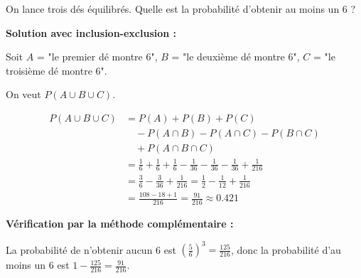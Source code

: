 \begin{examplebox}
On lance trois dés équilibrés. Quelle est la probabilité d'obtenir au moins un 6 ?

\textbf{Solution avec inclusion-exclusion :}

Soit $A$ = "le premier dé montre 6", $B$ = "le deuxième dé montre 6", $C$ = "le troisième dé montre 6".

On veut $P(A \cup B \cup C)$.

\begin{align*}
P(A \cup B \cup C) &= P(A) + P(B) + P(C) \\
&\quad - P(A \cap B) - P(A \cap C) - P(B \cap C) \\
&\quad + P(A \cap B \cap C) \\
&= \frac{1}{6} + \frac{1}{6} + \frac{1}{6} - \frac{1}{36} - \frac{1}{36} - \frac{1}{36} + \frac{1}{216} \\
&= \frac{3}{6} - \frac{3}{36} + \frac{1}{216} = \frac{1}{2} - \frac{1}{12} + \frac{1}{216} \\
&= \frac{108 - 18 + 1}{216} = \frac{91}{216} \approx 0.421
\end{align*}

\textbf{Vérification par la méthode complémentaire :}

La probabilité de n'obtenir aucun 6 est $\left(\frac{5}{6}\right)^3 = \frac{125}{216}$, donc la probabilité d'au moins un 6 est $1 - \frac{125}{216} = \frac{91}{216}$.
\end{examplebox}